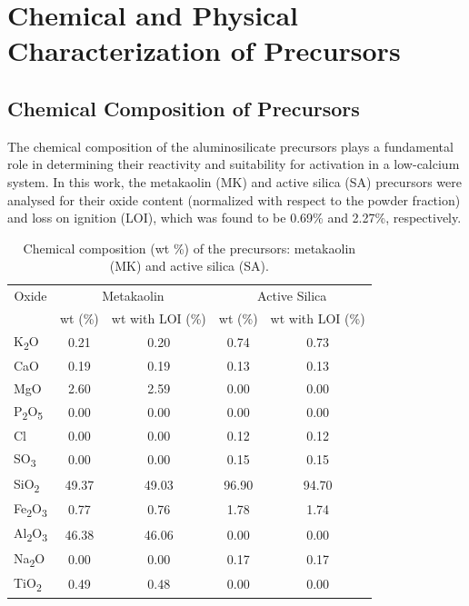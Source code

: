 \section{Chemical and Physical Characterization of Precursors}
\label{sec:chemical_and_physical_characterization_of_precursors}

\subsection{Chemical Composition of Precursors}
\label{sec:chemical_composition_of_precursors}

The chemical composition of the aluminosilicate precursors plays a fundamental role in determining their reactivity and suitability for activation in a low-calcium system. 
In this work, the metakaolin (MK) and active silica (SA) precursors were analysed for their oxide content (normalized with respect to the powder fraction) and loss on ignition (LOI), which was found to be 0.69\% and 2.27\%, respectively.

\begin{table}[H]
    \centering
    \caption{Chemical composition (wt \%) of the precursors: metakaolin (MK) and active silica (SA).}
    \label{tab:mk_sa_composition}
    \begin{tabular}{l c c c c}
        \hline
        \multicolumn{1}{c}{Oxide} & \multicolumn{2}{c}{Metakaolin} & \multicolumn{2}{c}{Active Silica} \\
        \cline{2-5}
        & wt (\%) & wt with LOI (\%) & wt (\%) & wt with LOI (\%) \\
        \hline
        K\textsubscript{2}O & 0.21 & 0.20 & 0.74 & 0.73 \\
        CaO & 0.19  & 0.19 & 0.13 & 0.13 \\
        MgO & 2.60 & 2.59 & 0.00 & 0.00 \\
        P\textsubscript{2}O\textsubscript{5} & 0.00 & 0.00 & 0.00 & 0.00 \\
        Cl & 0.00 & 0.00 & 0.12 & 0.12 \\
        SO\textsubscript{3} & 0.00 & 0.00 & 0.15 & 0.15 \\
        SiO\textsubscript{2} & 49.37 & 49.03 & 96.90 & 94.70 \\
        Fe\textsubscript{2}O\textsubscript{3} & 0.77 & 0.76 & 1.78 & 1.74 \\
        Al\textsubscript{2}O\textsubscript{3} & 46.38 & 46.06 & 0.00 & 0.00 \\
        Na\textsubscript{2}O & 0.00 & 0.00 & 0.17 & 0.17 \\
        TiO\textsubscript{2} & 0.49 & 0.48 & 0.00 & 0.00 \\
        \hline
    \end{tabular}
\end{table}

